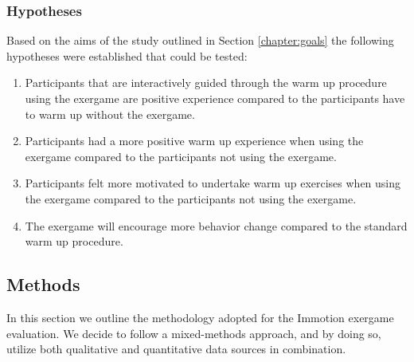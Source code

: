 \subsubsection{Hypotheses}
Based on the aims of the study outlined in Section  \ref{chapter:goals} the following hypotheses were established that could be tested: 
\begin{enumerate}
\item Participants that are interactively guided through the warm up procedure using the exergame are positive experience compared to the participants have to warm up without the exergame.
\item Participants had a more positive warm up experience when using the exergame compared to the participants not using the exergame.  
\item Participants felt more motivated to undertake warm up exercises when using the 
exergame compared to the participants not using the exergame.
\item The exergame will encourage more 
behavior change compared to the standard warm up procedure. 
\end{enumerate}

\subsection{Methods} 
In this section we outline the methodology adopted for the Immotion exergame evaluation.
We decide to follow a mixed-methods approach, and by doing so, utilize both qualitative and quantitative data sources in combination.
%
